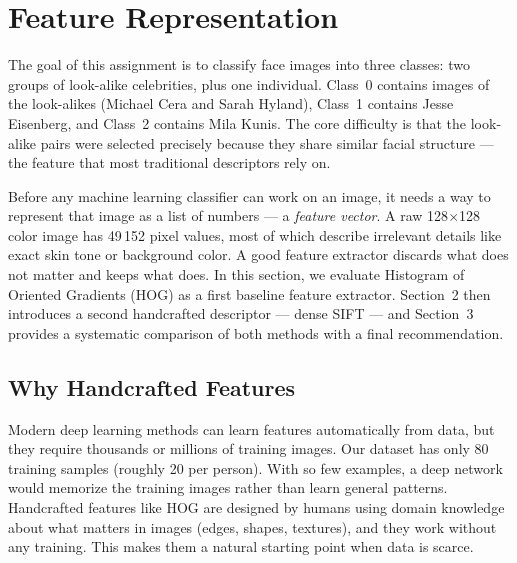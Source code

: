 \documentclass[a4paper,10pt]{article}
\begin{document}



\tableofcontents
\newpage

\section{Feature Representation}

The goal of this assignment is to classify face images into three classes: two groups of look-alike celebrities, plus one individual.
Class~0 contains images of the look-alikes (Michael Cera and Sarah Hyland), Class~1 contains Jesse Eisenberg, and Class~2 contains Mila Kunis.
The core difficulty is that the look-alike pairs were selected precisely because they share similar facial structure --- the feature that most traditional descriptors rely on.

Before any machine learning classifier can work on an image, it needs a way to represent that image as a list of numbers --- a \textit{feature vector}.
A raw 128$\times$128 color image has 49\,152 pixel values, most of which describe irrelevant details like exact skin tone or background color.
A good feature extractor discards what does not matter and keeps what does.
In this section, we evaluate Histogram of Oriented Gradients (HOG) as a first baseline feature extractor.
Section~2 then introduces a second handcrafted descriptor --- dense SIFT --- and Section~3 provides a systematic comparison of both methods with a final recommendation.

\subsection{Why Handcrafted Features}

Modern deep learning methods can learn features automatically from data, but they require thousands or millions of training images.
Our dataset has only 80 training samples (roughly 20 per person).
With so few examples, a deep network would memorize the training images rather than learn general patterns.
Handcrafted features like HOG are designed by humans using domain knowledge about what matters in images (edges, shapes, textures), and they work without any training.
This makes them a natural starting point when data is scarce.

\end{document}
